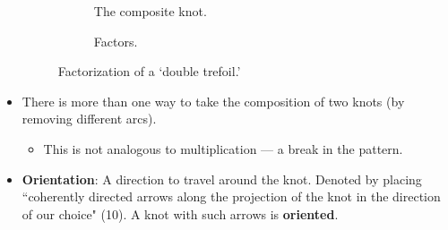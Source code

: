 \documentclass[titlepage]{article}
\numberwithin{figure}{section}
\numberwithin{table}{section}
\numberwithin{equation}{section}
\newcommand{\dq}[2]{``#1" (#2).}
\begin{document}
\begin{itemize}
\begin{figure}[h!]
\begin{subfigure}[b]{0.3\textwidth}
            \caption{The composite knot.}
            \label{fig:compos2a}
        \end{subfigure}
        \begin{subfigure}[b]{0.3\textwidth}
            \centering
            \vspace{-0.8cm}
            \caption{Factors.}
            \label{fig:compos2b}
        \end{subfigure}
        \caption{Factorization of a `double trefoil.'}
        \label{fig:compos2}
    \end{figure}
    \item There is more than one way to take the composition of two knots (by removing different arcs).
    \begin{itemize}
        \item This is not analogous to multiplication --- a break in the pattern.
    \end{itemize}
    \item \textbf{Orientation}: A direction to travel around the knot. Denoted by placing \dq{coherently directed arrows along the projection of the knot in the direction of our choice}{10} A knot with such arrows is \textbf{oriented}.
    \begin{itemize}

\end{itemize}
\end{itemize}
\end{document}
